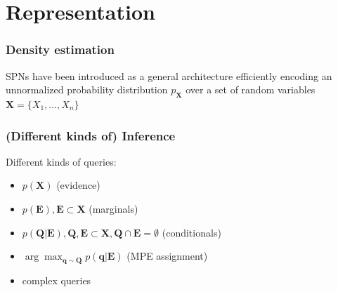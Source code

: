 \documentclass[10pt, t, xcolor={usenames,dvipsnames,svgnames}, compress]{beamer}
\begin{document}
\section{Representation}
{
  \begin{frame}[c]
    \sectionpage
  \end{frame}
}

\begin{frame}
  \frametitle{Density estimation}

SPNs have been introduced as a general architecture efficiently encoding an
unnormalized probability distribution $p_{\mathbf X}$ over a set of random 
variables $\mathbf X = \{X_1 , \ldots, X_n \}$

\end{frame}

\begin{frame}
  \frametitle{(Different kinds of) Inference}
  Different kinds of queries:
  \begin{itemize}
  \item $p(\mathbf{X})$ (evidence)
  \item $p(\mathbf{E}), \mathbf{E}\subset\mathbf{X}$ (marginals)
  \item $p(\mathbf{Q}|\mathbf{E}), \mathbf{Q},
    \mathbf{E}\subset\mathbf{X}, \mathbf{Q}\cap \mathbf{E}=\emptyset$ (conditionals)
  \item
    $\arg\max_{\mathbf{q}\sim\mathbf{Q}}p(\mathbf{q}|\mathbf{E})$
    (MPE assignment)
    \item complex queries
  \end{itemize}
\end{frame}
\end{document}
